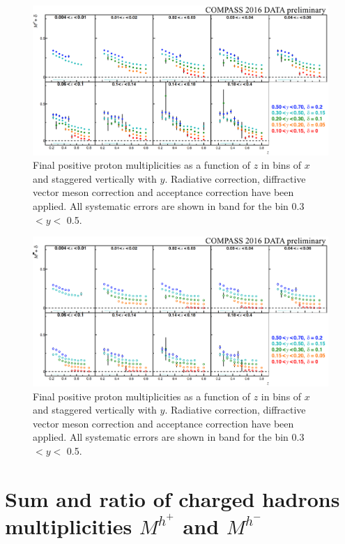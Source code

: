 \documentclass[letterpaper,12pt]{article}
\begin{document}
\begin{figure}
	\centering
	\includegraphics[scale=0.5]{./gfx/pp.png}
	\caption{Final positive proton multiplicities as a function of $z$ in bins of $x$ and staggered vertically with $y$. Radiative correction, diffractive vector meson correction and acceptance correction have been applied. All systematic errors are shown in band for the bin 0.3 $< y <$ 0.5.}
	\label{pp}
\end{figure}

\begin{figure}
	\centering
	\includegraphics[scale=0.5]{./gfx/pm.png}
	\caption{Final positive proton multiplicities as a function of $z$ in bins of $x$ and staggered vertically with $y$. Radiative correction, diffractive vector meson correction and acceptance correction have been applied. All systematic errors are shown in band for the bin 0.3 $< y <$ 0.5.}
	\label{pm}
\end{figure}

\newpage

\section{Sum and ratio of charged hadrons multiplicities $M^{h^+}$ and $M^{h^-}$} \label{MSR}
\end{document}
